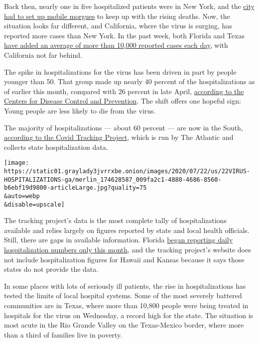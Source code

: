 Back then, nearly one in five hospitalized patients were in New York,
and the
\href{https://www.nytimes3xbfgragh.onion/2020/04/02/nyregion/coronavirus-new-york-bodies.html}{city
had to set up mobile morgues} to keep up with the rising deaths. Now,
the situation looks far different, and California, where the virus is
surging, has reported more cases than New York. In the past week, both
Florida and Texas
\href{https://www.nytimes3xbfgragh.onion/interactive/2020/us/coronavirus-us-cases.html}{have
added an average of more than 10,000 reported cases each day}, with
California not far behind.

The spike in hospitalizations for the virus has been driven in part by
people younger than 50. That group made up nearly 40 percent of the
hospitalizations as of earlier this month, compared with 26 percent in
late April,
\href{https://gis.cdc.gov/grasp/COVIDNet/COVID19_5.html}{according to
the Centers for Disease Control and Prevention}. The shift offers one
hopeful sign: Young people are less likely to die from the virus.

The majority of hospitalizations --- about 60 percent --- are now in the
South,
\href{https://covidtracking.com/data/charts/regional-current-hospitalizations}{according
to the Covid Tracking Project}, which is run by The Atlantic and
collects state hospitalization data.

\texttt{[image: https://static01.graylady3jvrrxbe.onion/images/2020/07/22/us/22VIRUS-HOSPITALIZATIONS-ga/merlin\_174628587\_009fa2c1-4880-4686-8560-b6ebf19d9800-articleLarge.jpg?quality=75\\\&auto=webp\\\&disable=upscale]}

The tracking project's data is the most complete tally of
hospitalizations available and relies largely on figures reported by
state and local health officials. Still, there are gaps in available
information. Florida
\href{https://www.miamiherald.com/news/coronavirus/article243899367.html}{began
reporting daily hospitalization numbers only this month}, and the
tracking project's website does not include hospitalization figures for
Hawaii and Kansas because it says those states do not provide the data.

In some places with lots of seriously ill patients, the rise in
hospitalizations has tested the limits of local hospital systems. Some
of the most severely battered communities are in Texas, where more than
10,800 people were being treated in hospitals for the virus on
Wednesday, a record high for the state. The situation is most acute in
the Rio Grande Valley on the Texas-Mexico border, where more than a
third of families live in poverty.

